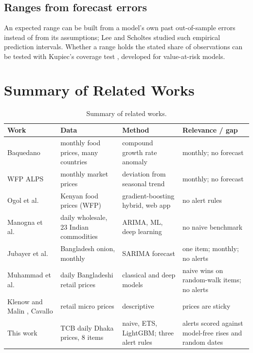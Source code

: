\subsection{Ranges from forecast errors}
An expected range can be built from a model's own past out-of-sample errors instead of from its assumptions; Lee and Scholtes \cite{lee2014} studied such empirical prediction intervals. Whether a range holds the stated share of observations can be tested with Kupiec's coverage test \cite{kupiec}, developed for value-at-risk models.

\section{Summary of Related Works}
\begin{table}[H]\centering\small
\caption[Summary of related works]{Summary of related works.}\label{tab:litsum}
\begin{tabularx}{\linewidth}{>{\raggedright\arraybackslash}p{2.6cm}>{\raggedright\arraybackslash}p{3.2cm}>{\raggedright\arraybackslash}p{3.0cm}X}
\toprule
\textbf{Work} & \textbf{Data} & \textbf{Method} & \textbf{Relevance / gap} \\
\midrule
Baquedano \cite{baquedano2015} & monthly food prices, many countries & compound growth rate anomaly & monthly; no forecast \\
WFP ALPS \cite{wfpalps2014} & monthly market prices & deviation from seasonal trend & monthly; no forecast \\
Ogol et al.\ \cite{ogol2025} & Kenyan food prices (WFP) & gradient-boosting hybrid, web app & no alert rules \\
Manogna et al.\ \cite{manogna2025} & daily wholesale, 23 Indian commodities & ARIMA, ML, deep learning & no naive benchmark \\
Jubayer et al.\ \cite{jubayer2024} & Bangladesh onion, monthly & SARIMA forecast & one item; monthly; no alerts \\
Muhammad et al.\ \cite{agripricebd} & daily Bangladeshi retail prices & classical and deep models & naive wins on random-walk items; no alerts \\
Klenow and Malin \cite{klenow2010}, Cavallo \cite{cavallo2018} & retail micro prices & descriptive & prices are sticky \\
This work & TCB daily Dhaka prices, 8 items & naive, ETS, LightGBM; three alert rules & alerts scored against model-free rises and random dates \\
\bottomrule
\end{tabularx}
\end{table}

